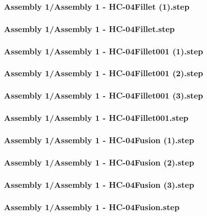 \documentclass[a4paper,12pt]{article}
\begin{document}
\begin{lstlising}[language=C++]
\subsubsection{Assembly 1/Assembly 1 - HC-04Fillet (1).step}

\subsubsection{Assembly 1/Assembly 1 - HC-04Fillet.step}

\subsubsection{Assembly 1/Assembly 1 - HC-04Fillet001 (1).step}

\subsubsection{Assembly 1/Assembly 1 - HC-04Fillet001 (2).step}

\subsubsection{Assembly 1/Assembly 1 - HC-04Fillet001 (3).step}

\subsubsection{Assembly 1/Assembly 1 - HC-04Fillet001.step}

\subsubsection{Assembly 1/Assembly 1 - HC-04Fusion (1).step}

\subsubsection{Assembly 1/Assembly 1 - HC-04Fusion (2).step}

\subsubsection{Assembly 1/Assembly 1 - HC-04Fusion (3).step}

\subsubsection{Assembly 1/Assembly 1 - HC-04Fusion.step}


\end{lstlising}
\end{document}
